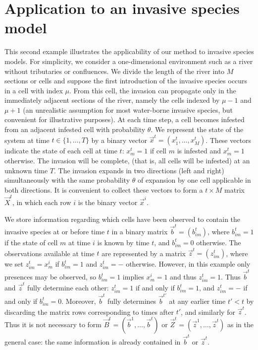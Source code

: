 






\section{Application to an invasive species model}
\label{sec:7}

This second example illustrates the applicability of our method to invasive species models. For simplicity, we consider a one-dimensional environment such as a river without tributaries or confluences. We divide the length of the river into $M$ sections or cells and suppose the first introduction of the invasive species occurs in a cell with index $\mu$. From this cell, the invasion can propagate only in the immediately adjacent sections of the river, namely the cells indexed by $\mu-1$ and $\mu+1$ (an unrealistic assumption for most water-borne invasive species, but convenient for illustrative purposes). At each time step, a cell becomes infested from an adjacent infested cell with probability $\theta$. We represent the state of the system at time $t \in \{ 1, \dots, T \}$ by a binary vector $\vec{x}^{t} = (x_1^{t}, \dots, x_{M}^{t})$. These vectors indicate the state of each cell at time $t$: $x_m^t = 1$ if cell $m$ is infested and $x_m^t = 1$ otherwise. The invasion will be complete, (that is, all cells will be infested) at an unknown time $T$. 
The invasion expands in two directions (left and right) simultaneously with the same probability $\theta$ of expansion by one cell applicable in both directions. It is convenient to collect these vectors to form a $t\times M$ matrix $\vec{X}^{t}$, in which each row $i$ is the binary vector $\vec{x}^{i}$.

We store information regarding which cells have been observed to contain the invasive species at or before time $t$ in a binary matrix $\vec{b}^t = (b_{im}^t)$, where $b_{im}^t = 1$ if the state of cell $m$ at time $i$ is known by time $t$, and $b_{im}^t = 0$ otherwise. The observations available at time $t$ are represented by a matrix $\vec{z}^t = (z_{im}^t)$, where we set $z_{im}^t = x^i_m$ if $b_{im}^t = 1$ and $z_{im}^t = -$ otherwise. However, in this example only presences may be observed, so $b_{im}^t = 1$ implies $x_m^i = 1$ and thus $z_{im}^t = 1$. Thus $\vec{b}^t$ and $\vec{z}^t$ fully determine each other: $z_{im}^t = 1$ if and only if $b_{im}^t = 1$, and $z_{im}^t = -$ if and only if $b_{im}^t = 0$. Moreover, $\vec{b}^t$ fully determines $\vec{b}^{t'}$ at any earlier time $t' < t$ by discarding the matrix rows corresponding to times after $t'$, and similarly for $\vec{z}^t$. Thus it is not necessary to form $\vec{B}^t = (\vec{b}^1,\ldots,\vec{b}^t)$ or $\vec{Z}^t = (\vec{z}^1,\ldots,\vec{z}^t)$ as in the general case: the same information is already contained in $\vec{b}^t$ or $\vec{z}^t$.

